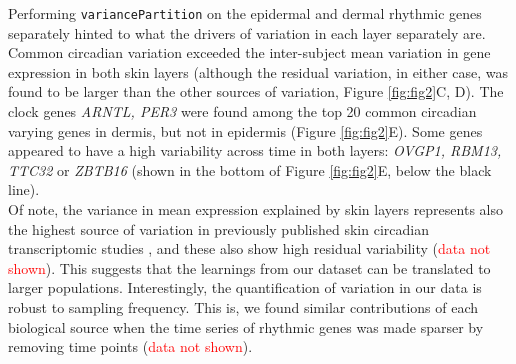 Performing \texttt{variancePartition} on the epidermal and dermal rhythmic genes separately hinted to what the drivers of variation in each layer separately are. Common circadian variation exceeded the inter-subject mean variation in gene expression in both skin layers (although the residual variation, in either case, was found to be larger than the other sources of variation, Figure \ref{fig:fig2}C, D). The clock genes \textit{ARNTL, PER3} were found among the top 20 common circadian varying genes in dermis, but not in epidermis (Figure \ref{fig:fig2}E). Some genes appeared to have a high variability across time in both layers: \textit{OVGP1, RBM13, TTC32} or \textit{ZBTB16} (shown in the bottom of Figure \ref{fig:fig2}E, below the black line). \\

Of note, the variance in mean expression explained by skin layers represents also the highest source of variation in previously published skin circadian transcriptomic studies \cite{GSE112660, GSE139300}, and these also show high residual variability (\textcolor{red}{data not shown}). This suggests that the learnings from our dataset can be translated to larger populations. Interestingly, the quantification of variation in our data is robust to sampling frequency. This is, we found similar contributions of each biological source when the time series of rhythmic genes was made sparser by removing time points (\textcolor{red}{data not shown}). \\%

